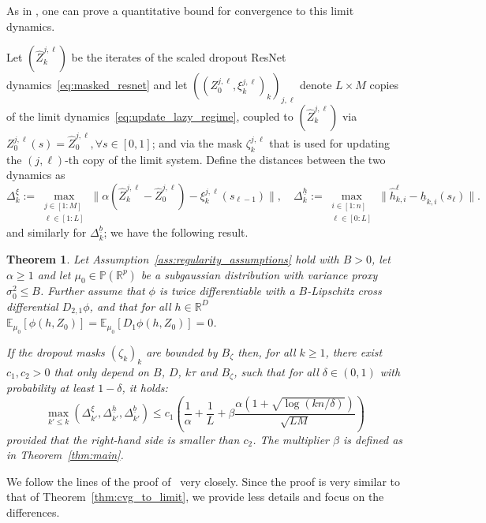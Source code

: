\documentclass[a4paper,11pt]{article}
\newcommand{\R}{\mathbb{R}}
\newcommand{\1}{\mathbbm{1}}
\newcommand{\E}{\mathbb{E}}
\renewcommand{\P}{\mathbb{P}}
\newtheorem{theorem}{Theorem}[section]
\theoremstyle{definition}
\theoremstyle{remark}
\begin{document}
As in \cite[Theorem 2]{chizat2025hidden}, one can prove a quantitative bound for convergence to this limit dynamics.

Let $(\hat{Z}_k^{j,\ell})$ be the iterates of the scaled dropout ResNet dynamics~\eqref{eq:masked_resnet} and let $((Z_0^{j,\ell}, \xi_k^{j,\ell})_k)_{j,\ell}$ denote $L\times M$ copies of the limit dynamics~\eqref{eq:update_lazy_regime}, coupled to $(\hat{Z}_k^{j,\ell})$ via $Z_0^{j,\ell}(s) = \hat{Z}_0^{j,\ell}, \forall s \in [0,1]$; and via the mask $\zeta^{j,\ell}_k$ that is used for updating the $(j,\ell)$-th copy of the limit system.
Define the distances between the two dynamics as
\[
    {\Delta}_k^\xi := \max_{\substack{j \in [1:M] \\ \ell \in [1:L]}} \|\alpha(\hat{Z}_k^{j,\ell}-\hat{Z}_0^{j,\ell}) - \xi_k^{j,\ell}(s_{\ell-1})\|, \quad
    {\Delta}_k^{\underline{h}} := \max_{\substack{i \in [1:n] \\ \ell \in [0:L]}} \|\hat{h}_{k,i}^\ell - \underline{h}_{k,i}(s_\ell)\|.
\]
and similarly for ${\Delta}_k^{\underline{b}}$; we have the following result.

\begin{theorem}\label{thm:cvg_to_lazy_limit}
Let Assumption~\ref{ass:regularity_assumptions} hold with $B>0$, let $\alpha \geq 1$ and let $\mu_0\in\P(\R^p)$ be a subgaussian distribution with variance proxy $\sigma_0^2 \leq B$.
Further assume that $\phi$ is twice differentiable with a $B$-Lipschitz cross differential $D_{2,1}\phi$, and that for all $h\in \R^D$ $\E_{\mu_0}[\phi(h, Z_0)] = \E_{\mu_0}[D_1\phi(h, Z_0)] = 0$. 

If the dropout masks $(\zeta_k)_k$ are {bounded by $B_\zeta$}
then, for all $k\geq 1$, there exist $c_1, c_2 > 0$ that only depend on $B$, $D$, $k\tau$ and
$B_\zeta$, such that for all $\delta\in(0,1)$ with probability at least $1 - \delta$, it holds:
\[
  \max_{k'\leq k} (\Delta_{k'}^\xi, \Delta_{k'}^{\underline{h}}, \Delta_{k'}^{\underline{b}})
  \leq c_1 \left(\frac{1}{\alpha} + \frac{1}{L}
    +  {\beta}\frac{\alpha(1 + \sqrt{\log(kn/\delta)})}{\sqrt{LM}}
  \right)
\]
provided that the right-hand side is smaller than $c_2$. {The multiplier $\beta$ is defined as in Theorem~\ref{thm:main}}.
\end{theorem}



We follow the lines of the proof of~\cite[Theorem 2]{chizat2025hidden} very closely. Since the proof is very similar to that of Theorem~\ref{thm:cvg_to_limit}, we provide less details and focus on the differences.
\end{document}
